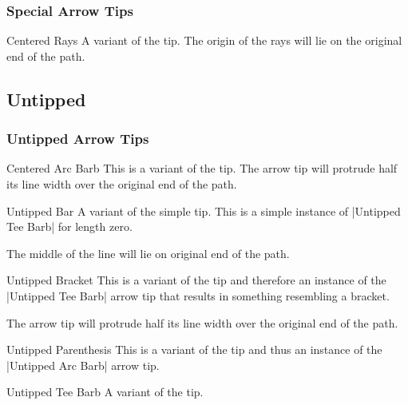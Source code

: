 \begin{multicols}{2}
\subsubsection{Special Arrow Tips}
\begin{arrowtipsimple}{Centered Rays}
    A variant of the  tip.
    The origin of the rays will lie on the original end of the path.
\end{arrowtipsimple}

\subsection{Untipped}
\subsubsection{Untipped Arrow Tips}
\begin{arrowtipsimple}{Centered Arc Barb}
    This is a variant of the  tip.
    The arrow tip will protrude half its line width over the original end of the path.
\end{arrowtipsimple}

\begin{arrowtipsimple}{Untipped Bar}
    A variant of the simple  tip.
    This is a simple instance of |Untipped Tee Barb| for length zero.
    
    The middle of the line will lie on original end of the path.
\end{arrowtipsimple}

\begin{arrowtipsimple}{Untipped Bracket}
    This is a variant of the  tip and
    therefore an instance of the |Untipped Tee Barb| arrow tip that results in something
    resembling a bracket.
    
    The arrow tip will protrude half its line width over the original end of the path.
\end{arrowtipsimple}

\begin{arrowtipsimple}{Untipped Parenthesis}
    This is a variant of the  tip and
    thus an instance of the |Untipped Arc Barb| arrow tip.
\end{arrowtipsimple}

\begin{arrowtipsimple}{Untipped Tee Barb}
    A variant of the  tip.
    

\end{arrowtipsimple}
\end{multicols}
